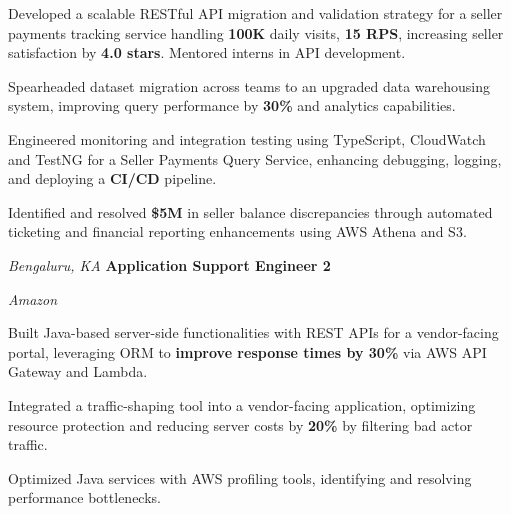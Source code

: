 \begin{onecolentry}
    \begin{highlights}
        \item Developed a scalable RESTful API migration and validation strategy for a seller payments tracking service handling \textbf{100K} daily visits, \textbf{15 RPS}, increasing seller satisfaction by \textbf{4.0 stars}. Mentored interns in API development.
        \item Spearheaded dataset migration across teams to an upgraded data warehousing system, improving query performance by \textbf{30\%} and analytics capabilities.
        \item Engineered monitoring and integration testing using TypeScript, CloudWatch and TestNG for a Seller Payments Query Service, enhancing debugging, logging, and deploying a \textbf{CI/CD} pipeline.
        \item Identified and resolved \textbf{\$5M} in seller balance discrepancies through automated ticketing and financial reporting enhancements using AWS Athena and S3.
    \end{highlights}
\end{onecolentry}

\vspace{0.15 cm}

\begin{twocolentry}{
    \textit{Bengaluru, KA}}
    \textbf{Application Support Engineer 2}
    
    \textit{Amazon}
\end{twocolentry}

\vspace{0.15 cm}

\begin{onecolentry}
    \begin{highlights}
        \item Built Java-based server-side functionalities with REST APIs for a vendor-facing portal, leveraging ORM to \textbf{improve response times by 30\%} via AWS API Gateway and Lambda.
        \item Integrated a traffic-shaping tool into a vendor-facing application, optimizing resource protection and reducing server costs by \textbf{20\%} by filtering bad actor traffic.
        \item Optimized Java services with AWS profiling tools, identifying and resolving performance bottlenecks.
    \end{highlights}
\end{onecolentry}
